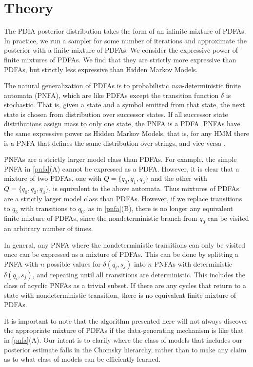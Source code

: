 \section{Theory}
\label{sec:theory}

The PDIA posterior distribution takes the form of an infinite mixture of PDFAs.  In practice, we run a sampler for some number of iterations and approximate the posterior with a finite mixture of PDFAs.  We consider the expressive power of finite mixtures of PDFAs.  We find that they are strictly more expressive than PDFAs, but strictly less expressive than Hidden Markov Models.

The natural generalization of PDFAs is to probabilistic {\em non}-deterministic finite automata (PNFA), which are like PDFAs except the transition function $\delta$ is stochastic.  That is, given a state and a symbol emitted from that state, the next state is chosen from distribution over successor states.  If all successor state distributions assign mass to only one state, the PNFA is a PDFA.  PNFAs have the same expressive power as Hidden Markov Models, that is, for any HMM there is a PNFA that defines the same distribution over strings, and vice versa \cite{Dupont2005}.

PNFAs are a strictly larger model class than PDFAs.  For example, the simple PNFA in \ref{pnfa}(A) cannot be expressed as a PDFA.  However, it is clear that a mixture of two PDFAs, one with $Q = \{q_0,q_1,q_3\}$ and the other with $Q = \{q_0,q_2,q_3\}$, is equivalent to the above automata.  Thus mixtures of PDFAs are a strictly larger model class than PDFAs.  However, if we replace transitions to $q_3$ with transitions to $q_0$, as in \ref{pnfa}(B), there is no longer any equivalent finite mixture of PDFAs, since the nondeterministic branch from $q_0$ can be visited an arbitrary number of times.  

In general, any PNFA where the nondeterministic transitions can only be visited once can be expressed as a mixture of PDFAs.  This can be done by splitting a PNFA with $n$ possible values for $\delta(q_i,s_j)$ into $n$ PNFAs with deterministic $\delta(q_i,s_j)$, and repeating until all transitions are deterministic.  This includes the class of acyclic PNFAs as a trivial subset.  If there are any cycles that return to a state with nondeterministic transition, there is no equivalent finite mixture of PDFAs.

It is important to note that the algorithm presented here will not always discover the appropriate mixture of PDFAs if the data-generating mechanism is like that in \ref{pnfa}(A).  Our intent is to clarify where the class of models that includes our posterior estimate falls in the Chomsky hierarchy, rather than to make any claim as to what class of models can be efficiently learned.

